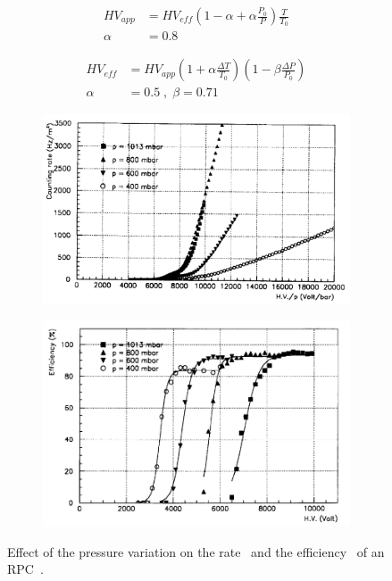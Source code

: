 	\begin{equation}
	\label{eq:PTCMS}
		\begin{aligned}
			HV_{app} &= HV_{eff}\left( 1 - \alpha + \alpha\frac{P_0}{P} \right) \frac{T}{T_0}\\
			\alpha &= 0.8
		\end{aligned}
	\end{equation}
	
	\begin{equation}
	\label{eq:PTATLAS}
		\begin{aligned}
			HV_{eff} &= HV_{app}\left( 1 + \alpha\frac{\Delta T}{T_0} \right) \left( 1 - \beta\frac{\Delta P}{P_0} \right)\\
			\alpha &= 0.5 \; , \; \beta = 0.71
		\end{aligned}
	\end{equation}
	
\endgroup
\newpage
	
	\begin{figure}[H]
		\begin{subfigure}{\linewidth}
			\centering
			\includegraphics[width = .7\linewidth]{fig/chapt3/Rate-pressure.png}\\
			\caption{\label{fig:PCorr:A}}
		\end{subfigure}
		\begin{subfigure}{\linewidth}
		    \centering
			\includegraphics[width = .7\linewidth]{fig/chapt3/Efficiency-pressure.png}
			\caption{\label{fig:PCorr:B}}
		\end{subfigure}
		\caption{\label{fig:PCorr} Effect of the pressure variation on the rate~ and the efficiency~ of an RPC~\cite{ABBRESCIA1997PRES}.}
	\end{figure}

\clearpage{\pagestyle{empty}\cleardoublepage}